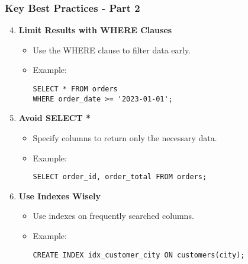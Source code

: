 \documentclass[aspectratio=169]{beamer}
\begin{document}
\begin{frame}[fragile]
    \frametitle{Key Best Practices - Part 2}
    \begin{enumerate}
        \setcounter{enumi}{3}
        \item \textbf{Limit Results with WHERE Clauses}
        \begin{itemize}
            \item Use the WHERE clause to filter data early.
            \item Example:
            \begin{lstlisting}
SELECT * FROM orders
WHERE order_date >= '2023-01-01';
            \end{lstlisting}
        \end{itemize}
        
        \item \textbf{Avoid SELECT *}
        \begin{itemize}
            \item Specify columns to return only the necessary data.
            \item Example:
            \begin{lstlisting}
SELECT order_id, order_total FROM orders;
            \end{lstlisting}
        \end{itemize}

        \item \textbf{Use Indexes Wisely}
        \begin{itemize}
            \item Use indexes on frequently searched columns.
            \item Example:
            \begin{lstlisting}
CREATE INDEX idx_customer_city ON customers(city);
            \end{lstlisting}
        \end{itemize}
    \end{enumerate}
\end{frame}
\end{document}
